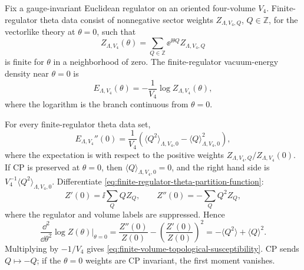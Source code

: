 \begin{definition}
\label{def:finite-regulator-theta-data}
Fix a gauge-invariant Euclidean regulator on an oriented four-volume \(V_4\).
Finite-regulator theta data consist of nonnegative sector weights
\(Z_{\Lambda,V_4,Q}\), \(Q\in\mathbb Z\), for the vectorlike theory at
\(\theta=0\), such that
\begin{equation}
  Z_{\Lambda,V_4}(\theta)
  =
  \sum_{Q\in\mathbb Z}
  \ee^{\ii\theta Q}Z_{\Lambda,V_4,Q}
  \label{eq:finite-regulator-theta-partition-function}
\end{equation}
is finite for \(\theta\) in a neighborhood of zero.  The finite-regulator
vacuum-energy density near \(\theta=0\) is
\begin{equation}
  E_{\Lambda,V_4}(\theta)
  =
  -\frac1{V_4}\log Z_{\Lambda,V_4}(\theta),
  \label{eq:finite-regulator-theta-energy}
\end{equation}
where the logarithm is the branch continuous from \(\theta=0\).
\end{definition}

\begin{remark}
\label{rem:finite-volume-topological-susceptibility}
For every finite-regulator theta data set,
\begin{equation}
  E_{\Lambda,V_4}''(0)
  =
  \frac1{V_4}
  \left(
    \langle Q^2\rangle_{\Lambda,V_4,0}
    -
    \langle Q\rangle_{\Lambda,V_4,0}^2
  \right),
  \label{eq:finite-volume-topological-susceptibility}
\end{equation}
where the expectation is with respect to the positive weights
\(Z_{\Lambda,V_4,Q}/Z_{\Lambda,V_4}(0)\).  If CP is preserved at
\(\theta=0\), then \(\langle Q\rangle_{\Lambda,V_4,0}=0\), and the right hand
side is \(V_4^{-1}\langle Q^2\rangle_{\Lambda,V_4,0}\).
Differentiate \eqref{eq:finite-regulator-theta-partition-function}:
\[
  Z'(0)=\ii\sum_Q Q Z_Q,
  \qquad
  Z''(0)=-\sum_Q Q^2Z_Q ,
\]
where the regulator and volume labels are suppressed.  Hence
\[
  \frac{\dd^2}{\dd\theta^2}\log Z(\theta)\bigg|_{\theta=0}
  =
  \frac{Z''(0)}{Z(0)}
  -
  \left(\frac{Z'(0)}{Z(0)}\right)^2
  =
  -\langle Q^2\rangle+\langle Q\rangle^2 .
  \]
Multiplying by \(-1/V_4\) gives
\eqref{eq:finite-volume-topological-susceptibility}.  CP sends
\(Q\mapsto -Q\); if the \(\theta=0\) weights are CP invariant, the first
moment vanishes.
\end{remark}

